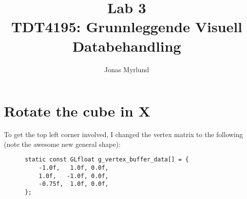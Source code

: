 \documentclass[11pt,a4paper]{article}
\begin{document}
  \title{Lab 3 \\ \large{TDT4195: Grunnleggende Visuell Databehandling}}
  \author{Jonas Myrlund}

  \maketitle
  
  \section{Rotate the cube in X} %
  \label{sec1}
  
    To get the top left corner involved, I changed the vertex matrix to the following (note the awesome new general shape):

    \begin{verbatim}
      static const GLfloat g_vertex_buffer_data[] = {
          -1.0f,   1.0f, 0.0f,
          1.0f,   -1.0f, 0.0f,
          -0.75f,  1.0f, 0.0f,
      };
    \end{verbatim}

  
\end{document}
